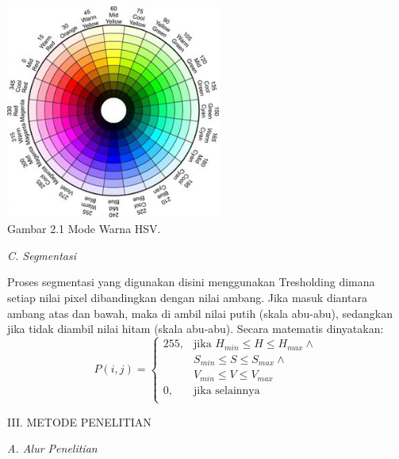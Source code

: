 \documentclass[10pt,journal,compsoc]{IEEEtran}
\begin{document}
  \begin{center}
    \includegraphics[width=200pt,height=200pt]{HSV}\\
    Gambar 2.1 Mode Warna HSV.
  \end{center}
  
  \noindent \textit{C. Segmentasi}
  
  Proses segmentasi yang digunakan disini menggunakan Tresholding dimana setiap nilai pixel dibandingkan dengan nilai ambang.
  Jika masuk diantara ambang atas dan bawah, maka di ambil nilai putih (skala abu-abu), sedangkan jika tidak diambil nilai hitam (skala abu-abu).
  Secara matematis dinyatakan:
  \begin{equation}
    P(i,j) =  
  \begin{cases}
      255,& \text{jika } H_{min} \leq H\leq H_{max} \land \\
      & S_{min} \leq S\leq S_{max} \land \\
      & V_{min} \leq V\leq V_{max}\\
      0,              & \text{jika selainnya } \\
  \end{cases}
  \end{equation}
  
  \begin{center}
     III. METODE PENELITIAN
  \end{center}
  
  \noindent \textit{A. Alur Penelitian}
  
\end{document}
